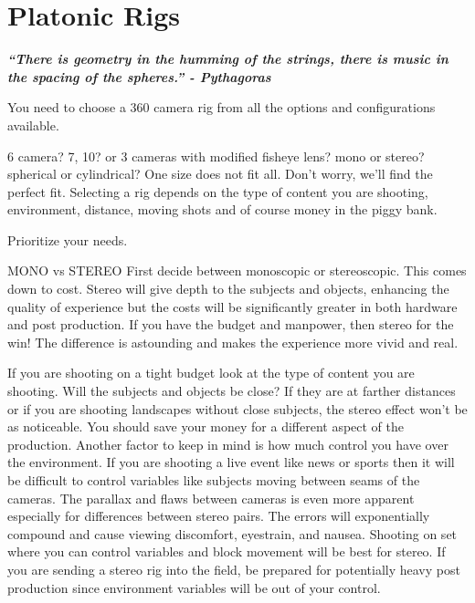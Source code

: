 \chapter{ Platonic Rigs}
\pagecolor{white}
\label{chap:2}
\begin{fullwidth}

{\itshape\bfseries “There is geometry in the humming of the strings, there is music in the spacing of the spheres.”
- Pythagoras

\vspace{\baselineskip}

\problem

{\large You need to choose a 360 camera rig from all the options and configurations available.
 \par}

6 camera? 7, 10? or 3 cameras with modified fisheye lens? mono or stereo? spherical or cylindrical? One size does not fit all. Don’t worry, we’ll find the perfect fit. Selecting a rig depends on the type of content you are shooting, environment, distance, moving shots and of course money in the piggy bank.

\solution

{\large Prioritize your needs.
 \par}

MONO vs STEREO
First decide between monoscopic or stereoscopic. This comes down to cost. Stereo will give depth to the subjects and objects, enhancing the quality of experience but the costs will be significantly greater in both hardware and post production. If you have the budget and manpower, then stereo for the win! The difference is astounding and makes the experience more vivid and real. 

If you are shooting on a tight budget look at the type of content you are shooting. Will the subjects and objects be close? If they are at farther distances or if you are shooting landscapes without close subjects, the stereo effect won’t be as noticeable. You should save your money for a different aspect of the production. Another factor to keep in mind is how much control you have over the environment. If you are shooting a live event like news or sports then it will be difficult to control variables like subjects moving between seams of the cameras. The parallax and flaws between cameras is even more apparent especially for differences between stereo pairs. The errors will exponentially compound and cause viewing discomfort, eyestrain, and nausea. Shooting on set where you can control variables and block movement will be best for stereo. If you are sending a stereo rig into the field, be prepared for potentially heavy post production since environment variables will be out of your control. 

}
\end{fullwidth}
